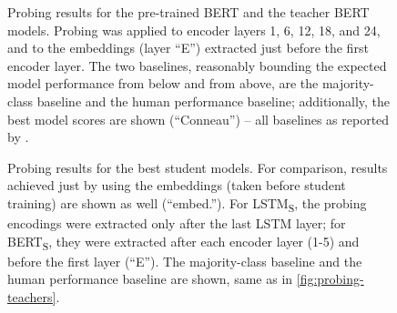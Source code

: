 \documentclass[bsc,frontabs,singlespacing,parskip,deptreport]{infthesis}
\def\BERTS{BERT\textsubscript{S}}
\def\LSTMS{LSTM\textsubscript{S}}
\begin{document}
{{    \begin{figure}[h!]
      \centering
      \cprotect\caption{Probing results for the pre-trained BERT and the teacher BERT models. Probing was applied to encoder layers 1, 6, 12, 18, and 24, and to the embeddings (layer ``E'') extracted just before the first encoder layer. The two baselines, reasonably bounding the expected model performance from below and from above, are the majority-class baseline and the human performance baseline; additionally, the best model scores are shown (``Conneau'') -- all baselines as reported by \citet{Conneau_2018}.}
      \label{fig:probing-teachers}
    \end{figure}

    \begin{figure}[h!]
      \centering
      \caption{Probing results for the best student models. For comparison, results achieved just by using the embeddings (taken before student training) are shown as well (``embed.''). For \LSTMS, the probing encodings were extracted only after the last LSTM layer; for \BERTS, they were extracted after each encoder layer (1-5) and before the first layer (``E''). The majority-class baseline and the human performance baseline are shown, same as in \autoref{fig:probing-teachers}.}
      \label{fig:probing-students}
    \end{figure}

}}
\end{document}

